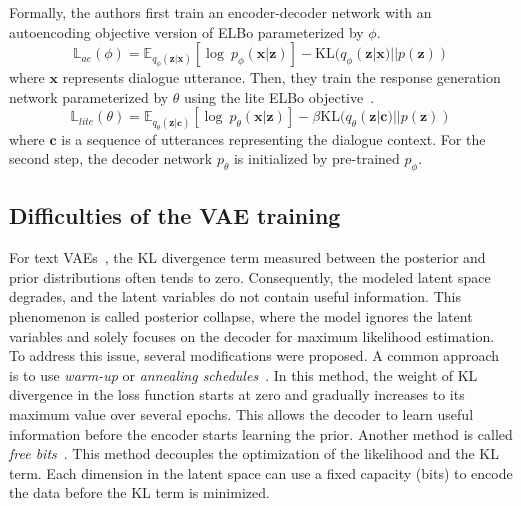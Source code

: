 Formally, the authors first train an encoder-decoder network with an autoencoding objective version of ELBo parameterized by $\phi$.
\begin{equation}
    \mathbb{L}_{ae}(\phi) = \mathbb{E}_{q_{\phi}(\mathbf{z}|\mathbf{x})}[\log~p_{\phi}(\mathbf{x}|\mathbf{z})] -\mathrm{KL}(q_{\phi}(\mathbf{z}|\mathbf{x})||p(\mathbf{z}))
\end{equation}
where $\mathbf{x}$ represents dialogue utterance.
Then, they train the response generation network parameterized by $\theta$ using the lite ELBo objective~\cite{lubis-etal-2020-lava}.
\begin{equation}
    \mathbb{L}_{lite}(\theta) = \mathbb{E}_{q_{\theta}(\mathbf{z}|\mathbf{c})}[\log~p_{\theta}(\mathbf{x}|\mathbf{z})] - \beta\mathrm{KL}(q_{\theta}(\mathbf{z}|\mathbf{c})||p(\mathbf{z}))
\end{equation}
where $\mathbf{c}$ is a sequence of utterances representing the dialogue context.
For the second step, the decoder network $p_{\theta}$ is initialized by pre-trained $p_{\phi}$.

\subsection{Difficulties of the VAE training}
\label{background:vae-problems}
For text VAEs~\citep{bowman-etal-2016-generating}, the KL divergence term measured between the posterior and prior distributions often tends to zero.
Consequently, the modeled latent space degrades, and the latent variables do not contain useful information.
This phenomenon is called posterior collapse, where the model ignores the latent variables and solely focuses on the decoder for maximum likelihood estimation.
To address this issue, several modifications were proposed.
A common approach is to use \emph{warm-up} or \emph{annealing schedules}~\cite {fu-etal-2019-cyclical}.
In this method, the weight of KL divergence in the loss function starts at zero and gradually increases to its maximum value over several epochs.
This allows the decoder to learn useful information before the encoder starts learning the prior.
Another method is called \emph{free bits}~\cite{li2019surprisingly}.
This method decouples the optimization of the likelihood and the KL term.
Each dimension in the latent space can use a fixed capacity (bits) to encode the data before the KL term is minimized.

